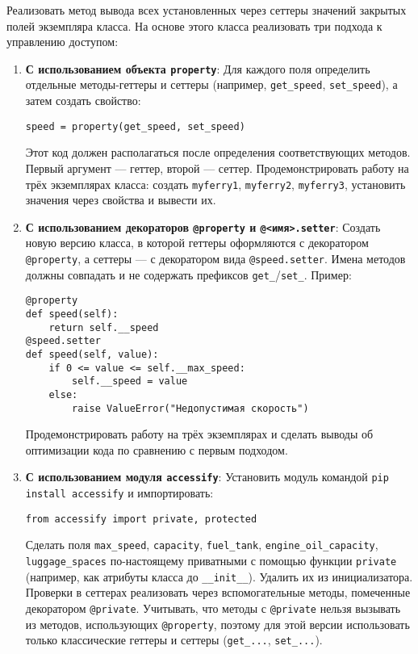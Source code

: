 \begin{enumerate}
\begin{itemize}
\end{itemize}
Реализовать метод вывода всех установленных через сеттеры значений закрытых полей экземпляра класса.
На основе этого класса реализовать три подхода к управлению доступом:
\begin{enumerate}
    \item \textbf{С использованием объекта \texttt{property}}:  
    Для каждого поля определить отдельные методы-геттеры и сеттеры (например, \texttt{get\_speed}, \texttt{set\_speed}), а затем создать свойство:  
    \begin{verbatim}
speed = property(get_speed, set_speed)
    \end{verbatim}  
    Этот код должен располагаться после определения соответствующих методов. Первый аргумент — геттер, второй — сеттер.  
    Продемонстрировать работу на трёх экземплярах класса: создать \texttt{myferry1}, \texttt{myferry2}, \texttt{myferry3}, установить значения через свойства и вывести их.
    \item \textbf{С использованием декораторов \texttt{@property} и \texttt{@<имя>.setter}}:  
    Создать новую версию класса, в которой геттеры оформляются с декоратором \texttt{@property}, а сеттеры — с декоратором вида \texttt{@speed.setter}. Имена методов должны совпадать и не содержать префиксов \texttt{get\_}/\texttt{set\_}.  
    Пример:  
    \begin{verbatim}
@property
def speed(self):
    return self.__speed
@speed.setter
def speed(self, value):
    if 0 <= value <= self.__max_speed:
        self.__speed = value
    else:
        raise ValueError("Недопустимая скорость")
    \end{verbatim}  
    Продемонстрировать работу на трёх экземплярах и сделать выводы об оптимизации кода по сравнению с первым подходом.
    \item \textbf{С использованием модуля \texttt{accessify}}:  
    Установить модуль командой \texttt{pip install accessify} и импортировать:  
    \begin{verbatim}
from accessify import private, protected
    \end{verbatim}  
    Сделать поля \texttt{max\_speed}, \texttt{capacity}, \texttt{fuel\_tank}, \texttt{engine\_oil\_capacity}, \texttt{luggage\_spaces} по-настоящему приватными с помощью функции \texttt{private} (например, как атрибуты класса до \texttt{\_\_init\_\_}). Удалить их из инициализатора.  
    Проверки в сеттерах реализовать через вспомогательные методы, помеченные декоратором \texttt{@private}.  
    Учитывать, что методы с \texttt{@private} нельзя вызывать из методов, использующих \texttt{@property}, поэтому для этой версии использовать только классические геттеры и сеттеры (\texttt{get\_...}, \texttt{set\_...}).  

\end{enumerate}
\end{enumerate}
